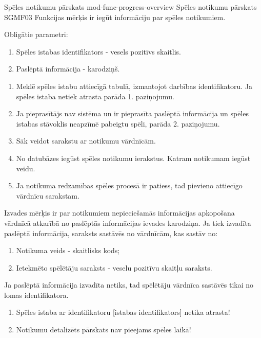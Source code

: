 \moduleFunctionTable
{Spēles notikumu pārskats}
{mod-func-progress-overview}
{Spēles notikumu pārskats}
{SGMF03}
{
	Funkcijas mērķis ir iegūt informāciju par spēles notikumiem.
}
{
	Obligātie parametri:
	\begin{enumerate}
		\item Spēles istabas identifikators - vesels pozitīvs skaitlis.
		\item Paslēptā informācija - karodziņš.
	\end{enumerate}
}
{
	\begin{enumerate}
		\item Meklē spēles istabu attiecīgā tabulā, izmantojot darbības identifikatoru.
		      Ja spēles istaba netiek atrasta parāda 1. paziņojumu.
		\item Ja pieprasītājs nav sistēma un ir pieprasīta paslēptā informācija un spēles istabas stāvoklis neapzīmē pabeigtu spēli, parāda 2. paziņojumu.
		\item Sāk veidot sarakstu ar notikumu vārdnīcām.
		\item No datubāzes iegūst spēles notikumu ierakstus.
		      Katram notikumam iegūst veidu.
		\item Ja notikuma redzamības spēles procesā ir patiess, tad pievieno attiecīgo vārdnīcu sarakstam.
	\end{enumerate}
}
{
	Izvades mērķis ir par notikumiem nepieciešamās informācijas apkopošana vārdnīcā atkarībā no paslēptās informācijas ievades karodziņa.
	Ja tiek izvadīta paslēptā informācija, saraksts sastāvēs no vārdnīcām, kas sastāv no:
	\begin{enumerate}
		\item Notikuma veids - skaitlisks kods;
		\item Ietekmēto spēlētāju saraksts - veselu pozitīvu skaitļu saraksts.
	\end{enumerate}
	Ja paslēptā informācija izvadīta netiks, tad spēlētāju vārdnīca sastāvēs tikai no lomas identifikatora.
}
{
	\begin{enumerate}
		\item Spēles istaba ar identifikatoru [istabas identifikators] netika atrasta!
		\item Notikumu detalizēts pārskats nav pieejams spēles laikā!
	\end{enumerate}
}
